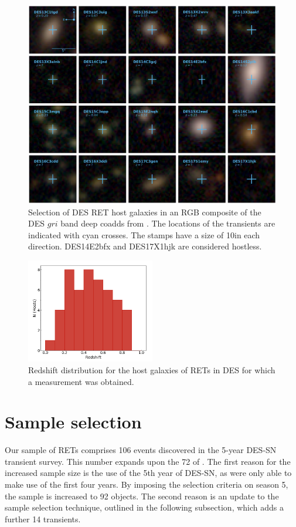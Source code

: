 \documentclass[fleqn,usenatbib,]{mnras}
\newcommand{\replyref}[1]{\color{magenta}#1 \color{black}}
\begin{document}
\begin{figure}
\includegraphics[width=\linewidth]{figs/RET_Mosaic.png}
\caption{Selection of DES RET host galaxies in an RGB composite of the DES $gri$ band deep coadds from . The locations of the transients are indicated with cyan crosses. The stamps have a size of 10\arcsec in each direction. DES14E2bfx and DES17X1hjk are considered hostless.
\label{fig:mosaic}}
\end{figure}

\begin{figure}
\includegraphics[width=0.5\textwidth]{figs/z_dist.png}
\caption{Redshift distribution for the host galaxies of RETs in DES for which a measurement was obtained.
\label{fig:z_dist}}
\end{figure}

\section{Sample selection}
\label{sec:sample}
\replyref{Our sample of RETs comprises 106 events} discovered in the 5-year DES-SN transient survey. This number expands upon the 72 of . The first reason for the increased sample size is the use of the 5th year of DES-SN, as  were only able to make use of the first four years. By imposing the  selection criteria on season 5, the sample is increased to 92 objects. The second reason is an update to the sample selection technique, outlined in the following subsection, which adds a further 14 transients.
\end{document}
